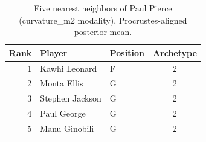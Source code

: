 \begin{table}[htbp]
  \centering\small
  \begin{tabular}{rllc}
    \toprule
    Rank & Player & Position & Archetype \\
    \midrule
    1 & Kawhi Leonard & F & 2 \\
    2 & Monta Ellis & G & 2 \\
    3 & Stephen Jackson & G & 2 \\
    4 & Paul George & G & 2 \\
    5 & Manu Ginobili & G & 2 \\
    \bottomrule
  \end{tabular}
  \caption{Five nearest neighbors of Paul Pierce (curvature_m2 modality), Procrustes-aligned posterior mean.}
  \label{tab:Paul_Pierce_neighbors_curvature_m2}
\end{table}

